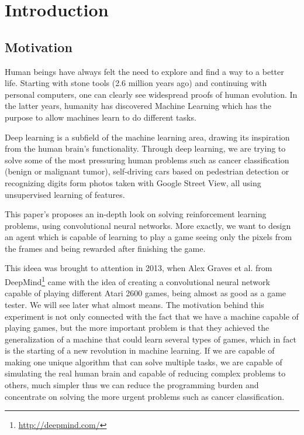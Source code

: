 \chapter{Introduction}
\label{chapter:intro}

\section{Motivation}
\label{sec:motivation}
Human beings have always felt the need to explore and find a way to a better life. Starting with stone tools (2.6 million years ago) and continuing with personal computers, one can clearly see widespread proofs of human evolution. In the latter years, humanity has discovered Machine Learning which has the purpose to allow machines learn to do different tasks.

Deep learning is a subfield of the machine learning area, drawing its inspiration from the human brain's functionality. Through deep learning, we are trying to solve some of the most pressuring human problems such as cancer classification (benign or malignant tumor)\cite{mitosis}, self-driving cars based on pedestrian detection\cite{pedestrian} or recognizing digits form photos taken with Google Street View\cite{svhn}, all using unsupervised learning of features.

This paper's proposes an in-depth look on solving reinforcement learning problems, using convolutional neural networks. More exactly, we want to design an agent which is capable of learning to play a game\cite{atari} seeing only the pixels from the frames and being rewarded after finishing the game.

This ideea was brought to attention in 2013, when Alex Graves et al. from DeepMind\footnote{\url{http://deepmind.com/}} came with the idea of creating a convolutional neural network capable of playing different Atari 2600 games, being almost as good as a game tester. We will see later what almost means. The motivation behind this experiment is not only connected with the fact that we have a machine capable of playing games, but the more important problem is that they achieved the generalization of a machine that could learn several types of games, which in fact is the starting of a new revolution in machine learning. If we are capable of making one unique algorithm that can solve multiple tasks, we are capable of simulating the real human brain and capable of reducing complex problems to others, much simpler thus we can reduce the programming burden and concentrate on solving the more urgent problems such as cancer classification.

